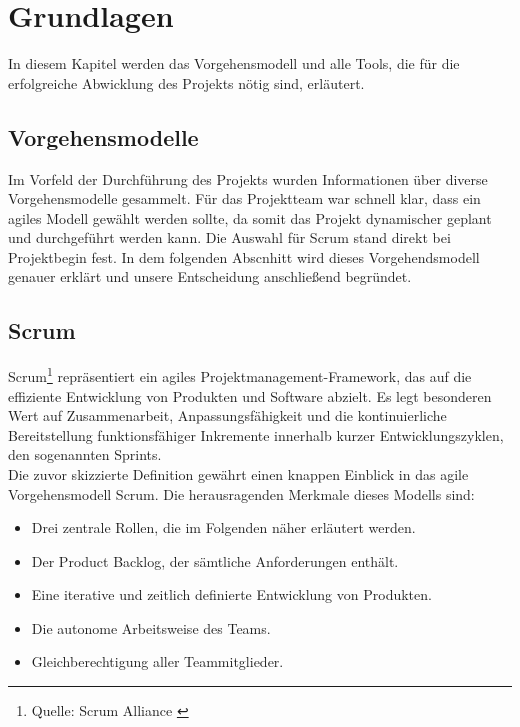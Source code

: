 \chapter{Grundlagen}
In diesem Kapitel werden das Vorgehensmodell und alle Tools, die für die erfolgreiche
Abwicklung des Projekts nötig sind, erläutert.

\section{Vorgehensmodelle}
Im Vorfeld der Durchführung des Projekts wurden Informationen über diverse Vorgehensmodelle
gesammelt. Für das Projektteam war schnell klar, dass ein agiles Modell gewählt werden sollte,
da somit das Projekt dynamischer geplant und durchgeführt werden kann. Die Auswahl für Scrum
stand direkt bei Projektbegin fest. In dem folgenden Abscnhitt wird dieses
Vorgehendsmodell genauer erklärt und unsere Entscheidung anschließend begründet.

\section{Scrum}
Scrum\footnote{Quelle: Scrum Alliance \cite{WHAT-IS-SCRUM}} repräsentiert ein agiles Projektmanagement-Framework,
das auf die effiziente Entwicklung von Produkten und Software abzielt. Es legt besonderen Wert auf Zusammenarbeit,
Anpassungsfähigkeit und die kontinuierliche Bereitstellung funktionsfähiger Inkremente innerhalb kurzer Entwicklungszyklen,
den sogenannten Sprints. \\

Die zuvor skizzierte Definition gewährt einen knappen Einblick in das agile Vorgehensmodell Scrum. Die herausragenden Merkmale dieses Modells sind:

\begin{itemize}
    \item Drei zentrale Rollen, die im Folgenden näher erläutert werden.
    \item Der Product Backlog, der sämtliche Anforderungen enthält.
    \item Eine iterative und zeitlich definierte Entwicklung von Produkten.
    \item Die autonome Arbeitsweise des Teams.
    \item Gleichberechtigung aller Teammitglieder.
\end{itemize}

